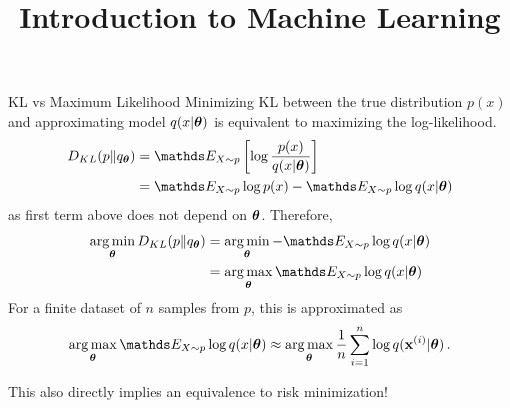 \documentclass[11pt,compress,t,notes=noshow, xcolor=table]{beamer}
\title{Introduction to Machine Learning}
\begin{document}
    

\begin{vbframe}{KL vs Maximum Likelihood}
Minimizing KL between the true distribution $p(x)$ and approximating model $q(x|\bm{\theta})$ is equivalent to maximizing the log-likelihood.
  \begin{align*}
    D_{KL}(p \| q_{\thetav}) &= \E_{X \sim p} \left[ \log \frac{p(x)}{q(x|\thetav)}\right] \\
     &= \E_{X \sim p} \log p(x) - \E_{X \sim p} \log q(x|\thetav)
  \end{align*}
  as first term above does not depend on $\bm{\theta}$.
  Therefore,
  \begin{align*}
    \argmin_{\thetav} D_{KL}(p \| q_{\thetav}) &= \argmin_{\thetav} -\E_{X \sim p} \log q(x|\thetav)\\ 
                                           &= \argmax_{\thetav} \E_{X \sim p} \log q(x|\thetav)
  \end{align*}
  For a finite dataset of $n$ samples from $p$, this is approximated as 
  $$\argmax_{\thetav} \E_{X \sim p} \log q(x|\thetav) \approx \argmax_{\thetav} \frac{1}{n} \sumin \log q(\xi|\thetav)\,.$$

  This also directly implies an equivalence to risk minimization!

\end{vbframe}
\end{document}
